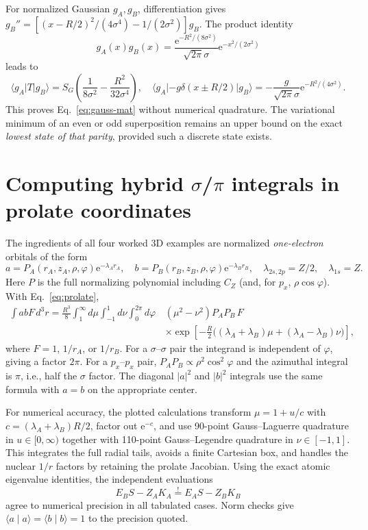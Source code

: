 \documentclass[11pt,letterpaper]{article}
\newcommand{\braket}[2]{\langle #1\mid #2\rangle}
\newcommand{\mel}[3]{\langle #1\lvert #2\rvert #3\rangle}
\newcommand{\e}{\mathrm e}
\begin{document}
For normalized Gaussian $g_A,g_B$, differentiation gives $g_B''=[(x-R/2)^2/(4\sigma^4)-1/(2\sigma^2)]g_B$. The product identity
\begin{equation}
g_A(x)g_B(x)=\frac{\e^{-R^2/(8\sigma^2)}}{\sqrt{2\pi}\sigma}\e^{-x^2/(2\sigma^2)}
\end{equation}
leads to
\begin{equation}
\mel{g_A}{T}{g_B}=S_G\left(\frac1{8\sigma^2}-\frac{R^2}{32\sigma^4}\right),\quad
\mel{g_A}{-g\delta(x\pm R/2)}{g_B}=-\frac g{\sqrt{2\pi}\sigma}\e^{-R^2/(4\sigma^2)}.
\end{equation}
This proves Eq.~\eqref{eq:gauss-mat} without numerical quadrature. The variational minimum of an even or odd superposition remains an upper bound on the exact \emph{lowest state of that parity}, provided such a discrete state exists.

\section{Computing hybrid $\sigma$/$\pi$ integrals in prolate coordinates}\label{app:prolate}
The ingredients of all four worked 3D examples are normalized \emph{one-electron} orbitals of the form
\begin{equation}
a=P_A(r_A,z_A,\rho,\varphi)\e^{-\lambda_A r_A},\quad
b=P_B(r_B,z_B,\rho,\varphi)\e^{-\lambda_B r_B},\quad
\lambda_{2s,2p}=Z/2,\quad\lambda_{1s}=Z.
\end{equation}
Here $P$ is the full normalizing polynomial including $C_Z$ (and, for $p_x$, $\rho\cos\varphi$). With Eq.~\eqref{eq:prolate},
\begin{equation}\label{eq:general-prolate}
\begin{split}
\int abF\,d^3r={\frac{R^3}{8}}\int_1^\infty d\mu\int_{-1}^1d\nu\int_0^{2\pi}d\varphi\,&(\mu^2-\nu^2)P_AP_B\,F\\[-2pt]
&\times\exp\left[-\tfrac R2\big((\lambda_A+\lambda_B)\mu+(\lambda_A-\lambda_B)\nu\big)\right],
\end{split}
\end{equation}
where $F=1$, $1/r_A$, or $1/r_B$. For a $\sigma$--$\sigma$ pair the integrand is independent of $\varphi$, giving a factor $2\pi$. For a $p_x$--$p_x$ pair, $P_AP_B\propto\rho^2\cos^2\varphi$ and the azimuthal integral is $\pi$, i.e., half the $\sigma$ factor. The diagonal $|a|^2$ and $|b|^2$ integrals use the same formula with $a=b$ on the appropriate center.

For numerical accuracy, the plotted calculations transform $\mu=1+u/c$ with $c=(\lambda_A+\lambda_B)R/2$, factor out $\e^{-c}$, and use 90-point Gauss--Laguerre quadrature in $u\in[0,\infty)$ together with 110-point Gauss--Legendre quadrature in $\nu\in[-1,1]$. This integrates the full radial tails, avoids a finite Cartesian box, and handles the nuclear $1/r$ factors by retaining the prolate Jacobian. Using the exact atomic eigenvalue identities, the independent evaluations
\begin{equation}
E_BS-Z_AK_A\stackrel{!}{=}E_AS-Z_BK_B
\end{equation}
agree to numerical precision in all tabulated cases. Norm checks give $\braket aa=\braket bb=1$ to the precision quoted.
\end{document}
